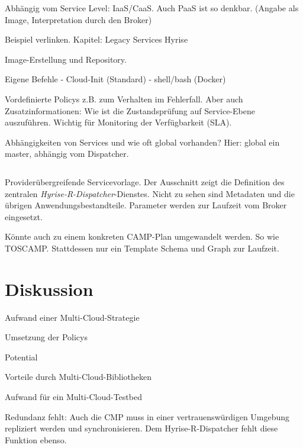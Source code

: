 Abhängig vom Service Level: IaaS/CaaS. Auch PaaS ist so denkbar. (Angabe als Image, Interpretation durch den Broker)

Beispiel verlinken.
Kapitel: Legacy Services Hyrise

Image-Erstellung und Repository.

Eigene Befehle
- Cloud-Init (Standard)
- shell/bash (Docker)

Vordefinierte Policys z.B. zum Verhalten im Fehlerfall. Aber auch Zusatzinformationen: Wie ist die Zustandsprüfung auf Service-Ebene auszuführen. Wichtig für Monitoring der Verfügbarkeit (SLA).

Abhängigkeiten von Services und wie oft global vorhanden? Hier: global ein master, abhängig vom Dispatcher.


\begin{listing}[ht]	
	\inputminted[firstline=15]{yaml}{./src/hyrise-r.sample.yaml}
	\caption{Providerübergreifende Servicevorlage. Der Ausschnitt zeigt die Definition des zentralen \emph{Hyrise-R-Dispatcher}-Dienstes. Nicht zu sehen sind Metadaten und die übrigen Anwendungsbestandteile. Parameter werden zur Laufzeit vom Broker eingesetzt.}
	\label{listing:hyrise-r}
\end{listing}

Könnte auch zu einem konkreten CAMP-Plan umgewandelt werden. So wie TOSCAMP. Stattdessen nur ein Template Schema und Graph zur Laufzeit.






\section{Diskussion}




Aufwand einer Multi-Cloud-Strategie

Umsetzung der Policys

Potential

Vorteile durch Multi-Cloud-Bibliotheken

Aufwand für ein Multi-Cloud-Testbed

Redundanz fehlt: Auch die CMP muss in einer vertrauenswürdigen Umgebung repliziert werden und synchronisieren. Dem Hyrise-R-Dispatcher fehlt diese Funktion ebenso.